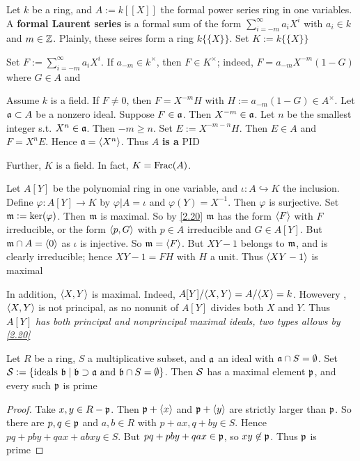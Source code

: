 \documentclass[11pt]{article}
\begin{document}
\begin{examplle}[]
Let \(k\) be a ring, and \(A:=k[[X]]\) the formal power series ring in one
variables. A \textbf{formal Laurent series} is a formal sum of the form
\(\sum_{i=-m}^\infty a_iX^i\) with \(a_i\in k\) and \(m\in\mathbb{Z}\). Plainly, these
seires form a ring \(k\{\{X\}\}\). Set \(K:=k\{\{X\}\}\)

Set \(F:=\sum_{i=-m}^\infty a_iX^i\). If \(a_{-m}\in k^\times\), then \(F\in
  K^\times\); indeed, \(F=a_{-m}X^{-m}(1-G)\) where \(G\in A\) and

Assume \(k\) is a field. If \(F\neq0\), then \(F=X^{-m}H\) with
\(H:=a_{-m}(1-G)\in A^\times\). Let \(\mathfrak{a}\subset A\) be a nonzero ideal.
Suppose \(F\in\mathfrak{a}\). Then \(X^{-m}\in\mathfrak{a}\). Let \(n\) be the smallest integer
s.t. \(X^n\in\mathfrak{a}\). Then \(-m\ge n\). Set \(E:=X^{-m-n}H\). Then \(E\in A\)
and \(F=X^nE\). Hence \(\mathfrak{a}=\langle X^n\rangle\). Thus \(A\) \textbf{is a} PID

Further, \(K\) is a field. In fact, \(K=\operatorname{Frac}(A)\).

Let \(A[Y]\) be the polynomial ring in one variable, and \(\iota:A\hookrightarrow
  K\) the inclusion.
Define \(\varphi:A[Y]\to K\) by \(\varphi|A=\iota\) and \(\varphi(Y)=X^{-1}\). Then \(\varphi\) is
surjective. Set \(\mathfrak{m}:=\ker(\varphi)\). Then \(\mathfrak{m}\) is maximal. So by \ref{2.20}
\(\mathfrak{m}\) has the form \(\langle F\rangle\) with \(F\) irreducible, or the form \(\langle
  p,G\rangle\) with \(p\in A\) irreducible and \(G\in A[Y]\). But \(\mathfrak{m}\cap
  A=\langle0\rangle\) as \(\iota\) is injective. So \(\mathfrak{m}=\langle F\rangle\). But \(XY-1\) belongs to
\(\mathfrak{m}\), and is clearly irreducible; hence \(XY-1=FH\) with \(H\) a unit. Thus
\(\langle XY-1\rangle\) is maximal

In addition, \(\langle X,Y\rangle\) is maximal. Indeed, \(A[Y]/\langle X,Y\rangle=A/\langle
  X\rangle=k\). Howevery ,\(\langle X,Y\rangle\) is not principal, as no nonunit of \(A[Y]\)
divides both \(X\) and \(Y\). Thus \(A[Y]\) \emph{has both principal and
nonprincipal maximal ideals, two types allows by \ref{2.20}}
\end{examplle}

\begin{proposition}[]
\label{3.9}
Let \(R\) be a ring, \(S\) a multiplicative subset, and \(\mathfrak{a}\) an ideal with
\(\mathfrak{a}\cap S=\emptyset\). Set \(\mathcal{S}:=\{\text{ideals
  }\mathfrak{b}\mid\mathfrak{b}\supset\mathfrak{a}\text{ and }\mathfrak{b}\cap S=\emptyset\}\). Then \(\mathcal{S}\) has a
maximal element \(\mathfrak{p}\), and every such \(\mathfrak{p}\) is prime
\end{proposition}

\begin{proof}
Take \(x,y\in R-\mathfrak{p}\). Then \(\mathfrak{p}+\langle x\rangle\) and \(\mathfrak{p}+\langle y\rangle\) are strictly
larger than \(\mathfrak{p}\). So there are \(p,q\in\mathfrak{p}\) and \(a,b\in R\) with
\(p+ax,q+by\in S\). Hence \(pq+pby+qax+abxy\in S\). But \(pq+pby+qax\in\mathfrak{p}\),
so \(xy\not\in\mathfrak{p}\). Thus \(\mathfrak{p}\) is prime
\end{proof}
\end{document}
